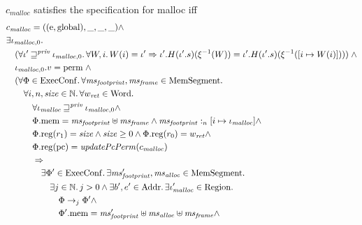 \documentclass[a4paper]{article}
\newcommand{\var}[1]{\mathit{#1}}
\newcommand{\hs}{\var{ms}}
\newcommand{\ms}{\hs}
\newcommand{\pcreg}{\mathrm{pc}}
\newcommand{\heap}{\var{mem}}
\newcommand{\plainproj}[1]{\mathrm{#1}}
\newcommand{\memheap}[1][\Phi]{#1.\plainproj{mem}}
\newcommand{\memreg}[1][\Phi]{#1.\plainproj{reg}}
\newcommand{\plainfun}[2]{
  \ifthenelse{\equal{#2}{}}
  {\mathit{#1}}
  {\mathit{#1}(#2)}
}
\newcommand{\updatePcPerm}[1]{\plainfun{updatePcPerm}{#1}}
\newcommand{\futurestr}{\mathbin{\sqsupseteq}^{\var{priv}}}
\newcommand{\heapSat}[3][\heap]{#1 :_{#2} #3}
\newcommand{\codelabel}[1]{\mathit{#1}}
\newcommand{\malloc}{\codelabel{malloc}}
\newcommand{\plaindom}[1]{\mathrm{#1}}
\newcommand{\Words}{\plaindom{Word}}
\newcommand{\Addrs}{\plaindom{Addr}}
\newcommand{\ExecConfs}{\plaindom{ExecConf}}
\newcommand{\HeapSegments}{\plaindom{MemSegment}}
\newcommand{\nats}{\mathbb{N}}
\newcommand{\Regions}{\plaindom{Region}}
\newcommand{\plainperm}[1]{\mathrm{#1}}
\newcommand{\entry}{\plainperm{e}}
\newcommand{\glob}{\plainperm{global}}
\newcommand{\plainview}[1]{\mathrm{#1}}
\newcommand{\perma}{\plainview{perm}}
\newcommand{\step}[1][]{\rightarrow_{#1}}
\begin{document}
              \begin{specification}
                \label{spec:malloc}
                $c_\malloc$ satisfies the specification for malloc iff
                \[  
                  \begin{aligned}
                    &c_\malloc = ((\entry,\glob),\_,\_,\_) \land\\
                    &\exists \iota_{\malloc,0} \ldotp \\
                    &\quad (\forall \iota' \futurestr \iota_{\malloc,0} \ldotp \forall W,i \ldotp W(i)=\iota' \Rightarrow \iota'.H (\iota'.s) (\xi^{-1}(W)) = \iota'.H (\iota'.s) (\xi^{-1}([i \mapsto W(i)])) ) \; \land \\
                    &\quad \iota_{\malloc,0}.v = \perma \; \land \\
                    &\quad (\forall \Phi \in \ExecConfs \ldotp \forall \ms_{\var{footprint}}, \hsframe \in \HeapSegments \ldotp \\
                    &\qquad \forall i, n, \size \in \nats \ldotp \forall
                    w_{\var{ret}} \in \Words \ldotp \\
                    &\qquad \quad \forall \iota_\malloc \futurestr \iota_{\malloc,0} \land \\
                    &\qquad \quad \memheap = \ms_{\var{footprint}} \uplus \hsframe \land \heapSat[\ms_{\var{footprint}}]{n}{[i \mapsto \iota_\malloc]} \land \\
                    &\qquad \quad \memreg(r_1) = \size \land \size \geq 0 \land  \memreg(r_0) = w_{\var{ret}} \land \\
                    &\qquad \quad \memreg(\pcreg) = \updatePcPerm{c_\malloc} \\ %
                    &\qquad \quad \Rightarrow \\
                    &\qquad \qquad\exists \Phi' \in \ExecConfs \ldotp \exists \ms_{\var{footprint}}', \ms_{\var{alloc}} \in \HeapSegments\ldotp\\
                    &\qquad \qquad \quad \exists j \in \nats \ldotp j > 0 \land \exists b',e'\in \Addrs \ldotp \exists \iota_\malloc' \in \Regions \ldotp \\
                    &\qquad \qquad \qquad \Phi \step[j] \Phi' \land \\
                    &\qquad \qquad \qquad \memheap[\Phi']=\ms_{\var{footprint}}' \uplus \hs_{\var{alloc}} \uplus \hsframe \land\\

\end{aligned}\]
\end{specification}
\end{document}
